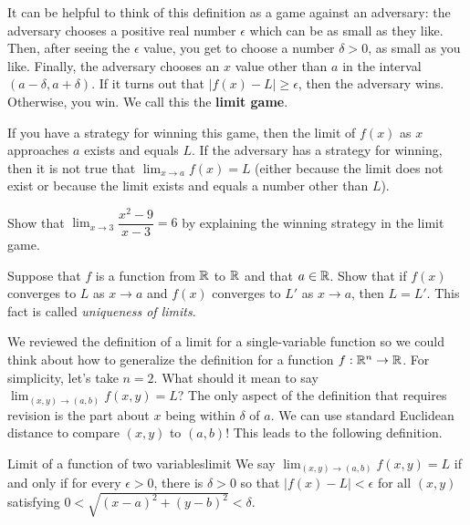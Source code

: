 \documentclass{watsonbook}
\begin{document}
It can be helpful to think of this definition as a game against an
adversary: the adversary chooses a positive real number $\epsilon$
which can be as small as they like. Then, after seeing the $\epsilon$
value, you get to choose a number $\delta>0$, as small as you
like. Finally, the adversary chooses an $x$ value other than $a$ in
the interval $(a-\delta, a + \delta)$. If it turns out that $|f(x) -
L| \geq \epsilon$, then the adversary wins. Otherwise, you win. We
call this the \textbf{limit game}. 

If you have a strategy for winning this game, then the limit of $f(x)$
as $x$ approaches $a$ exists and equals $L$. If the adversary has a
strategy for winning, then it is not true that $\lim_{x \to a} f(x) =
L$ (either because the limit does not exist or because the limit
exists and equals a number other than $L$).

\begin{exercise}{}{}
  Show that $\displaystyle{\lim_{x \to 3}}\dfrac{x^2 - 9}{x - 3} = 6$ by explaining
  the winning strategy in the limit game. 
\end{exercise}

\begin{exercise}{}{}
  Suppose that $f$ is a function from $\mathbb{R}$ to $\mathbb{R}$ and that
  $a \in \mathbb{R}$. Show that if $f(x)$ converges to $L$ as $x\to a$ and
  $f(x)$ converges to $L'$ as $x\to a$, then $L = L'$. This fact is called
  \textit{uniqueness of limits}. 
\end{exercise}

We reviewed the definition of a limit for a single-variable function
so we could think about how to generalize the definition for a
function $f:\mathbb{R}^n \to \mathbb{R}$. For simplicity, let's take $n = 2$. What
should it mean to say
$\displaystyle{\lim_{(x,y) \to (a,b)} f(x,y)} = L$? The only aspect of 
the definition that requires revision is the part about $x$ being
within $\delta$ of $a$. We can use standard Euclidean distance to
compare $(x,y)$ to $(a,b)$! This leads to the following definition. 

\begin{defn}{Limit of a function of two variables}{limit}
  We say $\lim_{(x,y)\to (a,b)} f(x,y) = L$ if and only if for every
  $\epsilon > 0$, there is $\delta>0$ so that $|f(x) - L| < \epsilon$
  for all $(x,y)$ satisfying $0 < \sqrt{(x -a)^2 + (y-b)^2} < \delta$. 
\end{defn}
\end{document}
